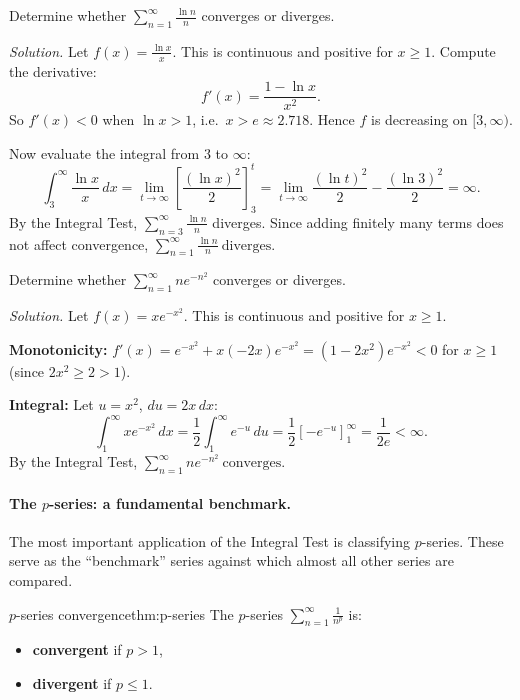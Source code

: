 \begin{examplebox}[title={Worked Example (Lecture Example 5.2): $\sum \frac{\ln n}{n}$ diverges}]
Determine whether $\displaystyle\sum_{n=1}^{\infty}\frac{\ln n}{n}$ converges or diverges.

\emph{Solution.}
Let $f(x)=\frac{\ln x}{x}$. This is continuous and positive for $x\ge 1$.
Compute the derivative:
\[
f'(x)=\frac{1-\ln x}{x^2}.
\]
So $f'(x)<0$ when $\ln x>1$, i.e.\ $x>e\approx 2.718$. Hence $f$ is decreasing on $[3,\infty)$.

Now evaluate the integral from $3$ to $\infty$:
\[
\int_3^{\infty}\frac{\ln x}{x}\,dx
=\lim_{t\to\infty}\left[\frac{(\ln x)^2}{2}\right]_3^{t}
=\lim_{t\to\infty}\frac{(\ln t)^2}{2}-\frac{(\ln 3)^2}{2}=\infty.
\]
By the Integral Test, $\sum_{n=3}^{\infty}\frac{\ln n}{n}$ diverges. Since adding finitely many terms does not affect convergence, $\displaystyle\boxed{\sum_{n=1}^{\infty}\frac{\ln n}{n}\ \text{diverges}}$.
\end{examplebox}

\begin{examplebox}[title={Worked Example (Tutorial 9, Q1(c)): $\sum n e^{-n^2}$ converges}]
Determine whether $\displaystyle\sum_{n=1}^{\infty}n e^{-n^2}$ converges or diverges.

\emph{Solution.}
Let $f(x)=xe^{-x^2}$. This is continuous and positive for $x\ge 1$.

\textbf{Monotonicity:} $f'(x)=e^{-x^2}+x(-2x)e^{-x^2}=(1-2x^2)e^{-x^2}<0$ for $x\ge 1$ (since $2x^2\ge 2>1$).

\textbf{Integral:} Let $u=x^2$, $du=2x\,dx$:
\[
\int_1^{\infty}xe^{-x^2}\,dx
=\frac{1}{2}\int_1^{\infty}e^{-u}\,du
=\frac{1}{2}\left[-e^{-u}\right]_1^{\infty}
=\frac{1}{2e}<\infty.
\]
By the Integral Test, $\displaystyle\boxed{\sum_{n=1}^{\infty}ne^{-n^2}\ \text{converges}}$.
\end{examplebox}

\paragraph{The $p$-series: a fundamental benchmark.}

The most important application of the Integral Test is classifying $p$-series.
These serve as the ``benchmark'' series against which almost all other series are compared.

\begin{theorem}{$p$-series convergence}{thm:p-series}
The $p$-series $\displaystyle\sum_{n=1}^{\infty}\frac{1}{n^p}$ is:
\begin{itemize}[leftmargin=*]
\item \textbf{convergent} if $p>1$,
\item \textbf{divergent} if $p\le 1$.
\end{itemize}
\end{theorem}


